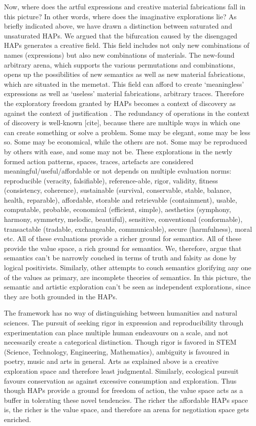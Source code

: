 Now, where does the artful expressions and creative material fabrications fall in this picture? In other words, where does the imaginative explorations lie? As briefly indicated above, we have drawn a distinction between saturated and unsaturated HAPs. We argued that the bifurcation caused by the disengaged HAPs generates a creative field. This field includes not only new combinations of names (expressions) but also new combinations of materials. The new-found arbitrary arena, which supports the various permutations and combinations, opens up the possibilities of new semantics as well as new material fabrications, which are situated in the memetat. This field can afford to create `meaningless' expressions as well as `useless' material fabrications, arbitrary traces. Therefore the exploratory freedom granted by HAPs becomes a context of discovery as against the context of justification \cite{reichenbach1938experience, popper2005logic}. The redundancy of operations in the context of discovery is well-known [cite], because there are multiple ways in which one can create something or solve a problem. Some may be elegant, some may be less so. Some may be economical, while the others are not. Some may be reproduced by others with ease, and some may not be. These explorations in the newly formed action patterns, spaces, traces, artefacts are considered meaningful/useful/affordable or not depends on multiple evaluation norms: reproducible (veracity, falsifiable), reference-able, rigor, validity, fitness (consistency, coherence), sustainable (survival, conservable, stable, balance, health, reparable), affordable, storable and retrievable (containment), usable, computable, probable, economical (efficient, simple), aesthetics (symphony, harmony, symmetry, melodic, beautiful), sensitive, conventional (conformable), transactable (tradable, exchangeable, communicable), secure (harmfulness), moral etc. All of these evaluations provide a richer ground for semantics. All of these provide the value space, a rich ground for semantics. We, therefore, argue that semantics can't be narrowly couched in terms of truth and falsity as done by logical positivists. Similarly, other attempts to couch semantics glorifying any one of the values as primary, are incomplete theories of semantics. In this picture, the semantic and artistic exploration can't be seen as independent explorations, since they are both grounded in the HAPs.

The framework has no way of distinguishing between humanities and natural sciences. The pursuit of seeking rigor in expression and reproducibility through experimentation can place multiple human endeavours on a scale, and not necessarily create a categorical distinction. 
Though rigor is favored in STEM (Science, Technology, Engineering, Mathematics), ambiguity is favoured in poetry, music and arts in general. Arts as explained above is a creative exploration space and therefore least judgmental. Similarly, ecological pursuit favours conservation as against excessive consumption and exploration. Thus though HAPs provide a ground for freedom of action, the value space acts as a buffer in tolerating these novel tendencies.  The richer the affordable HAPs space is, the richer is the value space, and therefore an arena for negotiation space gets enriched. 

